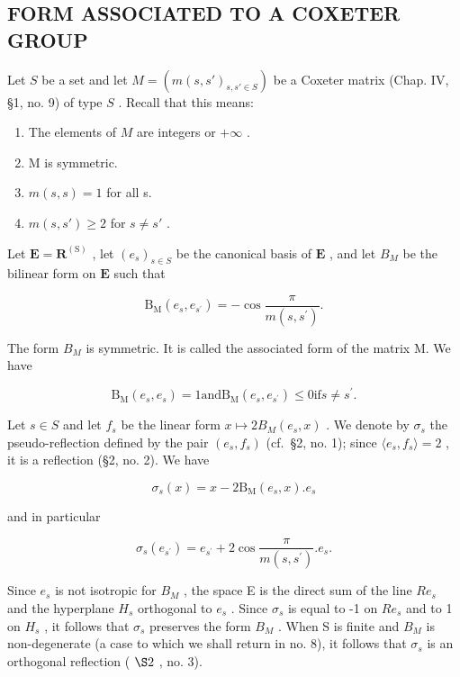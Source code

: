\subsection{FORM ASSOCIATED TO A COXETER GROUP}

Let \(S\) be a set and let \(M = (m(s, s')_{s, s' \in S})\) be a Coxeter matrix (Chap. IV, §1, no. 9) of type \(S\) . Recall that this means:

\begin{enumerate}
\def\labelenumi{(\arabic{enumi})}
\item
  The elements of \(M\) are integers or \(+\infty\) .
\item
  M is symmetric.
\item
  \(m(s, s) = 1\) for all s.
\item
  \(m(s, s') \geqslant 2\) for \(s \neq s'\) .
\end{enumerate}

Let \(\mathbf{E} = \mathbf{R}^{(\mathrm{S})}\) , let \((e_s)_{s \in S}\) be the canonical basis of \(\mathbf{E}\) , and let \(B_M\) be the bilinear form on \(\mathbf{E}\) such that

\[
\mathrm{B} _ {\mathrm{M}} (e _ {s}, e _ {s ^ {\prime}}) = - \cos \frac {\pi}{m (s , s ^ {\prime})}.
\]

The form \(B_{M}\) is symmetric. It is called the associated form of the matrix M. We have

\[
\mathrm{B} _ {\mathrm{M}} \left(e _ {s}, e _ {s}\right) = 1 \text {and} \mathrm{B} _ {\mathrm{M}} \left(e _ {s}, e _ {s ^ {\prime}}\right) \leqslant 0 \text {if} s \neq s ^ {\prime}.
\]

Let \(s \in S\) and let \(f_s\) be the linear form \(x \mapsto 2B_M(e_s, x)\) . We denote by \(\sigma_s\) the pseudo-reflection defined by the pair \((e_s, f_s)\) (cf.~§2, no. 1); since \(\langle e_s, f_s \rangle = 2\) , it is a reflection (§2, no. 2). We have

\[
\sigma_ {s} (x) = x - 2 \mathrm{B} _ {\mathrm{M}} (e _ {s}, x). e _ {s}
\]

and in particular

\[
\sigma_ {s} (e _ {s ^ {\prime}}) = e _ {s ^ {\prime}} + 2 \cos \frac {\pi}{m (s , s ^ {\prime})}. e _ {s}.
\]

Since \(e_{s}\) is not isotropic for \(B_{M}\) , the space E is the direct sum of the line \(Re_{s}\) and the hyperplane \(H_{s}\) orthogonal to \(e_{s}\) . Since \(\sigma_{s}\) is equal to -1 on \(Re_{s}\) and to 1 on \(H_{s}\) , it follows that \(\sigma_{s}\) preserves the form \(B_{M}\) . When S is finite and \(B_{M}\) is non-degenerate (a case to which we shall return in no. 8), it follows that \(\sigma_{s}\) is an orthogonal reflection ( \(\S2\) , no. 3).


